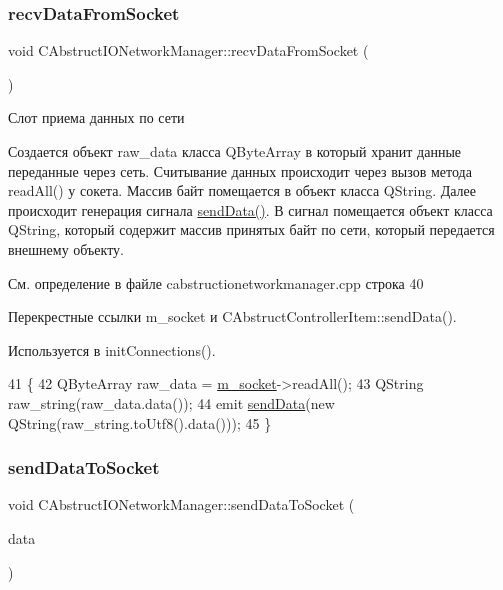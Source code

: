\subsubsection{\texorpdfstring{recv\+Data\+From\+Socket}{recvDataFromSocket}}
{\footnotesize\ttfamily void C\+Abstruct\+I\+O\+Network\+Manager\+::recv\+Data\+From\+Socket (\begin{DoxyParamCaption}{ }\end{DoxyParamCaption})\hspace{0.3cm}{\ttfamily [slot]}}



Слот приема данных по сети 

Создается объект raw\+\_\+data класса Q\+Byte\+Array в который хранит данные переданные через сеть. Считывание данных происходит через вызов метода read\+All() у сокета. Массив байт помещается в объект класса Q\+String. Далее происходит генерация сигнала \hyperlink{class_c_abstruct_controller_item_a7cf2bebc87a7d0b660318e946a176eb9}{send\+Data()}. В сигнал помещается объект класса Q\+String, который содержит массив принятых байт по сети, который передается внешнему объекту. 

См. определение в файле cabstructionetworkmanager.\+cpp строка 40



Перекрестные ссылки m\+\_\+socket и C\+Abstruct\+Controller\+Item\+::send\+Data().



Используется в init\+Connections().


\begin{DoxyCode}
41 \{
42     QByteArray raw\_data = \hyperlink{class_c_abstruct_i_o_network_manager_a0c8754d8191c83c660f43b8c89e39d4e}{m\_socket}->readAll();
43     QString raw\_string(raw\_data.data());
44     emit \hyperlink{class_c_abstruct_controller_item_a7cf2bebc87a7d0b660318e946a176eb9}{sendData}(\textcolor{keyword}{new} QString(raw\_string.toUtf8().data()));
45 \}
\end{DoxyCode}
\hypertarget{class_c_abstruct_i_o_network_manager_a7e6c20ce1264c76a2cc66114f8490629}{}\label{class_c_abstruct_i_o_network_manager_a7e6c20ce1264c76a2cc66114f8490629} 
\subsubsection{\texorpdfstring{send\+Data\+To\+Socket}{sendDataToSocket}}
{\footnotesize\ttfamily void C\+Abstruct\+I\+O\+Network\+Manager\+::send\+Data\+To\+Socket (\begin{DoxyParamCaption}\item[{Q\+String $\ast$}]{data }\end{DoxyParamCaption})\hspace{0.3cm}{\ttfamily [slot]}}



